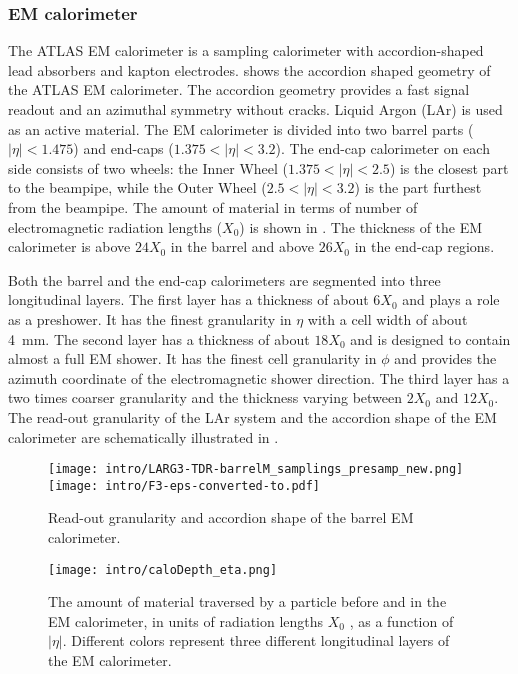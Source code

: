 \subsubsection{EM calorimeter}
The ATLAS EM calorimeter is a sampling calorimeter with accordion-shaped lead absorbers and kapton electrodes.
 shows the accordion shaped geometry of the ATLAS EM calorimeter. The accordion geometry provides a fast signal readout and an azimuthal symmetry without cracks. Liquid Argon (LAr) is used as an active material. The EM calorimeter is divided into two barrel parts ($|\eta|<1.475$) and end-caps ($1.375<|\eta|<3.2$).
The end-cap calorimeter on each side consists of two wheels: the Inner Wheel ($1.375<|\eta|<2.5$) is the closest part to the beampipe, while the
Outer Wheel ($2.5<|\eta|<3.2$) is the part furthest from the beampipe.
The amount of material in terms of number of electromagnetic radiation lengths ($X_0$) is shown in .
The thickness of the EM calorimeter is above $24 X_0$ in the barrel and above $26 X_0$ in the end-cap regions.

Both the barrel and the end-cap calorimeters are segmented into three longitudinal layers. The first layer has a thickness of about $6 X_0$ and plays a role as a preshower. It has the finest granularity in $\eta$ with a cell width of about 4~mm. The second layer has a thickness of about $18 X_0$ and is designed to contain almost a full EM shower. It has the finest cell granularity in $\phi$ and provides the azimuth coordinate of the electromagnetic shower direction. The third layer has a two times coarser granularity and the thickness varying between $2 X_0$ and $12 X_0$. The read-out granularity of the LAr system and the accordion shape of the EM calorimeter are schematically illustrated in .

\begin{figure}[h]
\centering
 \texttt{[image: intro/LARG3-TDR-barrelM\_samplings\_presamp\_new.png]}
 \texttt{[image: intro/F3-eps-converted-to.pdf]}
 \caption{Read-out granularity and accordion shape of the barrel EM calorimeter.}
\label{fig:EMgran}
\end{figure}

\begin{figure}[h]
\centering
 \texttt{[image: intro/caloDepth\_eta.png]}
 \caption{
 The amount of material traversed by a particle before and in the EM calorimeter, in units of radiation lengths $X_0$ , as a function of $|\eta|$. Different colors represent three different longitudinal layers of the EM calorimeter.}
\label{fig:material_budget_calo}
\end{figure}

